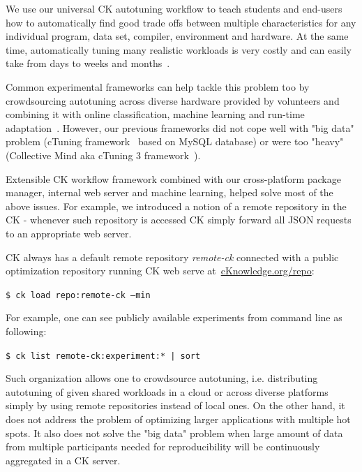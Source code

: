 We use our universal CK autotuning workflow to teach students and end-users 
how to automatically find good trade offs between multiple characteristics 
for any individual program, data set, compiler, environment and hardware.
%
At the same time, automatically tuning many realistic workloads
is very costly and can easily take from days to weeks and months~\cite{29db2248aba45e59:a31e374796869125}.

Common experimental frameworks can help tackle this problem too by 
crowdsourcing autotuning across diverse hardware provided by volunteers and combining it with online
classification, machine learning and run-time adaptation~\cite{Fur2009,JGVP2009,cm:29db2248aba45e59:cd11e3a188574d80}.
%
However, our previous frameworks did not cope well with "big data" problem
(cTuning framework~\cite{Fur2009,new_pub_model} based on MySQL database) 
or were too "heavy" (Collective Mind aka cTuning 3 framework~\cite{fursin:hal-01054763}).

Extensible CK workflow framework combined with our cross-platform package manager, 
internal web server and machine learning, helped solve most of the above issues.
%
For example, we introduced a notion of a remote repository in the CK - 
whenever such repository is accessed CK simply forward all JSON requests 
to an appropriate web server.

CK always has a default remote repository \textit{remote-ck} connected
with a public optimization repository running CK web serve 
at~\url{cKnowledge.org/repo}: 

\begin{flushleft}
\texttt{\$ ck load repo:remote-ck --min}
\end{flushleft}

For example, one can see publicly available experiments from command line as following:
\begin{flushleft}
\texttt{\$ ck list remote-ck:experiment:* | sort}
\end{flushleft}

Such organization allows one to crowdsource autotuning, i.e. distributing autotuning 
of given shared workloads in a cloud or across diverse platforms simply by using remote 
repositories instead of local ones.
%
On the other hand, it does not address the problem of optimizing larger applications
with multiple hot spots.
%
It also does not solve the "big data" problem when large amount of data from multiple participants
needed for reproducibility will be continuously aggregated in a CK server.

